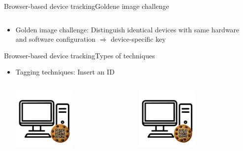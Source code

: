 \documentclass[aspectratio=169, hyperref={colorlinks=true, allcolors=SecondaryColor}, c]{beamer}
\begin{document}
\begin{frame}[fragile]{Browser-based device tracking}{Goldene image challenge}
\begin{columns}
\begin{column}{0.33\textwidth}
			\end{column}
		\end{columns}
		\vspace{-0.5cm}
		\begin{itemize}
			\item \alert{Golden image challenge:} Distinguish identical devices with same hardware and software configuration \checkboxChecked \alert{$\Rightarrow$ device-specific key}
		\end{itemize}
	\end{frame}

	\begin{frame}[fragile]{Browser-based device tracking}{Types of techniques}
		\begin{itemize}
			\item \alert{Tagging techniques:} Insert an ID
			\begin{columns}
				\begin{column}{0.33\textwidth}
					\includegraphics[width=0.5\textwidth, center]{./figures/computer_alpha_cookie_1.png}
				\end{column}
				\begin{column}{0.33\textwidth}
					\includegraphics[width=0.5\textwidth, center]{./figures/computer_alpha_cookie_2.png}

\end{column}
\end{columns}
\end{itemize}
\end{frame}
\end{document}
